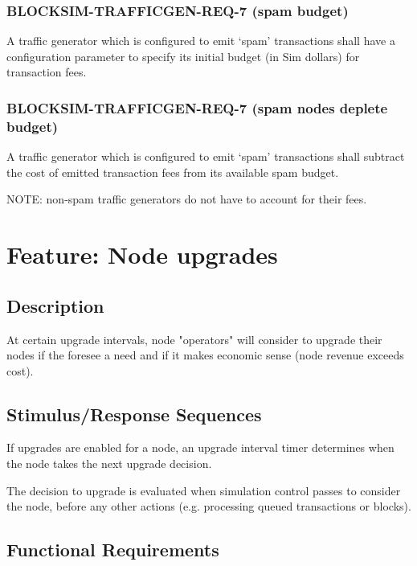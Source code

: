 \documentclass{scrreprt}
\begin{document}
\subsubsection{BLOCKSIM-TRAFFICGEN-REQ-7 (spam budget)}

A traffic generator which is configured to emit `spam' transactions
shall have a configuration parameter to specify its initial budget
(in Sim dollars) for transaction fees.


\subsubsection{BLOCKSIM-TRAFFICGEN-REQ-7 (spam nodes deplete budget)}

A traffic generator which is configured to emit `spam' transactions
shall subtract the cost of emitted transaction fees from its available
spam budget.

NOTE: non-spam traffic generators do not have to account for their fees.




\section{Feature: Node upgrades}

\subsection{Description}

At certain upgrade intervals, node "operators" will consider to upgrade
their nodes if the foresee a need and if it makes economic sense
(node revenue exceeds cost).


\subsection{Stimulus/Response Sequences}

If upgrades are enabled for a node, an upgrade interval timer determines
when the node takes the next upgrade decision.

The decision to upgrade is evaluated when simulation control passes to
consider the node, before any other actions (e.g. processing queued
transactions or blocks).


\subsection{Functional Requirements}
\end{document}
